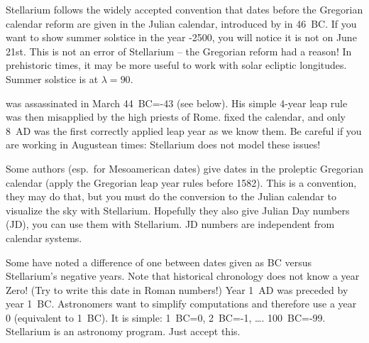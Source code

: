 Stellarium follows the widely accepted convention that dates before the Gregorian calendar 
reform are given in the Julian calendar, introduced by  in 46~BC. 
If you want to show summer solstice in the year -2500, you will notice it is not on June 21st. 
This is not an error of Stellarium -- the Gregorian reform had a reason! In prehistoric times, 
it may be more useful to work with solar ecliptic longitudes. Summer solstice is at $\lambda=90$.

 was assassinated in March 44~BC=-43 (see below). His simple 4-year leap rule was 
then misapplied by the high priests of Rome.  fixed the calendar, and only 8~AD was the 
first correctly applied leap year as we know them. Be careful if you are working in Augustean times: 
Stellarium does not model these issues!

Some authors (esp.\ for Mesoamerican dates) give dates in the proleptic Gregorian calendar 
(apply the Gregorian leap year rules before 1582). This is a convention, they may do that, 
but you must do the conversion to the Julian calendar to visualize the sky with Stellarium. 
Hopefully they also give Julian Day numbers (JD), you can use them with Stellarium. 
JD numbers are independent from calendar systems. 

Some have noted a difference of one between dates given as BC versus Stellarium's negative years. 
Note that historical chronology does not know a year Zero! (Try to write this date in Roman numbers!) 
Year 1~AD was preceded by year 1~BC. Astronomers want to simplify computations and therefore 
use a year 0 (equivalent to 1~BC). It is simple: 1~BC=0, 2~BC=-1, \ldots. 100~BC=-99. 
Stellarium is an astronomy program. Just accept this.






